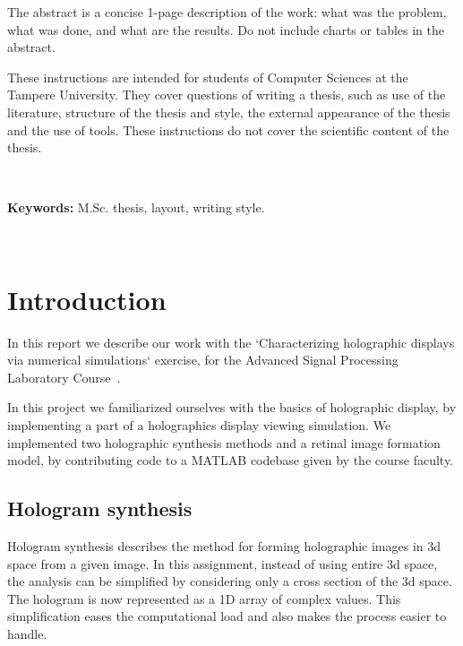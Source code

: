 \documentclass[12pt,a4paper,english
]{tunithesis}
\begin{document}
\vspace{0.5cm}


\noindent The abstract is a concise 1-page description of the work: what was the
problem, what was done, and what are the results. Do not include
charts or tables in the abstract.

These instructions are intended for students of Computer Sciences at the Tampere University. They cover questions of writing a thesis, such as use of the literature, structure of the thesis and style, the external appearance of the thesis and the use of tools.  These instructions do not cover the scientific content of the thesis.

~

\noindent\textbf{Keywords:} M.Sc. thesis, layout, writing style.

~




\setcounter{tocdepth}{3}              %
\tableofcontents                      %


\if@twoside
\cleardoublepage
\fi


\renewcommand{\chaptername}{} %


\chapter{Introduction}
\label{ch:intro}
\setcounter{page}{1} 
In this report we describe our work with the `Characterizing holographic displays via
numerical simulations` exercise, for the Advanced Signal Processing Laboratory Course~\cite{labassignment}.

In this project we familiarized ourselves with the basics of holographic display, by implementing a part of a holographics display viewing simulation. We implemented two holographic synthesis methods and a retinal image formation model, by contributing code to a MATLAB codebase given by the course faculty.

\section{Hologram synthesis}
Hologram synthesis describes the method for forming holographic images in 3d space from a given image. In this assignment, instead of using entire 3d space, the analysis can be simplified by considering only a cross section of the 3d space. The hologram is now represented as a 1D array of complex values. This simplification eases the computational load and also makes the process easier to handle.
\end{document}
